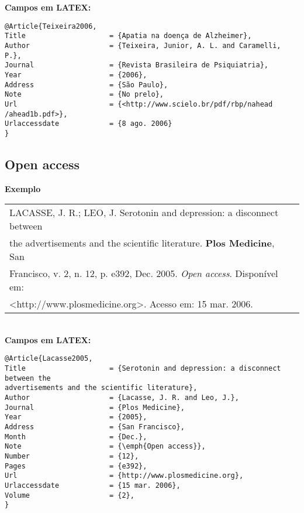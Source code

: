 \textbf{Campos em LATEX:} 
	
\begingroup
\fontsize{10pt}{12pt}\selectfont
\begin{verbatim}
@Article{Teixeira2006,
Title                    = {Apatia na doença de Alzheimer},
Author                   = {Teixeira, Junior, A. L. and Caramelli, 
P.},
Journal                  = {Revista Brasileira de Psiquiatria},
Year                     = {2006},
Address                  = {São Paulo},
Note                     = {No prelo},
Url                      = {<http://www.scielo.br/pdf/rbp/nahead
/ahead1b.pdf>},
Urlaccessdate            = {8 ago. 2006}
}
\end{verbatim}
\endgroup
	
\subsection{Open access}
	
\textbf{Exemplo} \\
	
\begin{tabular}{|l|c|} \hline
	LACASSE, J. R.; LEO, J. Serotonin and depression: a disconnect between \\ the advertisements and the scientific literature. \textbf{Plos Medicine}, San \\Francisco, v. 2, n. 12, p. e392, Dec. 2005. \emph{Open access}. Disponível em: \\<http://www.plosmedicine.org>. Acesso em: 15 mar. 2006. 
	                                                                       \\\hline
\end{tabular} \\
	
\textbf{Campos em LATEX:} 
	
\begingroup
\fontsize{10pt}{12pt}\selectfont
\begin{verbatim}
@Article{Lacasse2005,
Title                    = {Serotonin and depression: a disconnect 
between the 
advertisements and the scientific literature},
Author                   = {Lacasse, J. R. and Leo, J.},
Journal                  = {Plos Medicine},
Year                     = {2005},
Address                  = {San Francisco},
Month                    = {Dec.},
Note                     = {\emph{Open access}},
Number                   = {12},
Pages                    = {e392},
Url                      = {http://www.plosmedicine.org},
Urlaccessdate            = {15 mar. 2006},
Volume                   = {2},
}
\end{verbatim}
\endgroup
	
